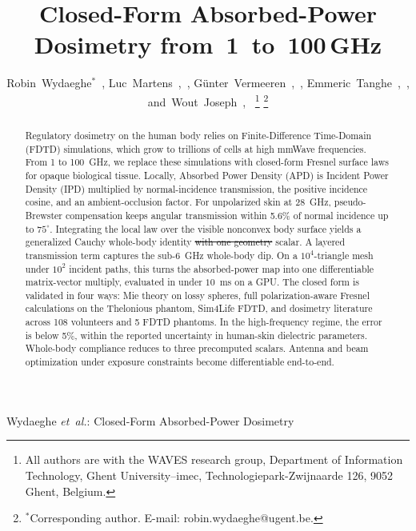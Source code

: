 \documentclass[journal,twocolumn,10pt]{IEEEtran}
\providecommand{\DIFaddtex}[1]{{\protect\color{blue}\uwave{#1}}} %
\providecommand{\DIFdeltex}[1]{{\protect\color{red}\sout{#1}}}                      %
\providecommand{\DIFaddbegin}{} %
\providecommand{\DIFaddend}{} %
\providecommand{\DIFdelbegin}{} %
\providecommand{\DIFdelend}{} %
\providecommand{\DIFadd}[1]{\texorpdfstring{\DIFaddtex{#1}}{#1}} %
\providecommand{\DIFdel}[1]{\texorpdfstring{\DIFdeltex{#1}}{}} %
\newcommand{\DIFscaledelfig}{0.5}
\newlength{\DIFdelgraphicswidth} %
\newlength{\DIFdelgraphicsheight} %
\newcommand{\DIFaddincludegraphics}[2][]{{\color{blue}\fbox{\DIFOincludegraphics[#1]{#2}}}} %
\newcommand{\DIFdelincludegraphics}[2][]{%
\sbox{\DIFdelgraphicsbox}{\DIFOincludegraphics[#1]{#2}}%
\settoboxwidth{\DIFdelgraphicswidth}{\DIFdelgraphicsbox} %
\settoboxtotalheight{\DIFdelgraphicsheight}{\DIFdelgraphicsbox} %
\scalebox{\DIFscaledelfig}{%
\parbox[b]{\DIFdelgraphicswidth}{\usebox{\DIFdelgraphicsbox}\\[-\baselineskip] \rule{\DIFdelgraphicswidth}{0em}}\llap{\resizebox{\DIFdelgraphicswidth}{\DIFdelgraphicsheight}{%
\setlength{\unitlength}{\DIFdelgraphicswidth}%
\begin{picture}(1,1)%
\thicklines\linethickness{2pt} %
{\color[rgb]{1,0,0}\put(0,0){\framebox(1,1){}}}%
{\color[rgb]{1,0,0}\put(0,0){\line( 1,1){1}}}%
{\color[rgb]{1,0,0}\put(0,1){\line(1,-1){1}}}%
\end{picture}%
}\hspace*{3pt}}} %
} %
\DeclareRobustCommand{\DIFaddbegin}{\DIFOaddbegin \let\includegraphics\DIFaddincludegraphics} %
\DeclareRobustCommand{\DIFaddend}{\DIFOaddend \let\includegraphics\DIFOincludegraphics} %
\DeclareRobustCommand{\DIFdelbegin}{\DIFOdelbegin \let\includegraphics\DIFdelincludegraphics} %
\DeclareRobustCommand{\DIFdelend}{\DIFOaddend \let\includegraphics\DIFOincludegraphics} %
\begin{document}
\title{Closed-Form Absorbed-Power Dosimetry from~1~to~100\,GHz}

\author{Robin~Wydaeghe$^{*}$~,
  Luc~Martens~,~,
  G\"unter~Vermeeren~,~,
  Emmeric~Tanghe~,~,
  and~Wout~Joseph~,~%
  \thanks{All authors are with the WAVES research group, Department of
  Information Technology, Ghent University--imec, Technologiepark-Zwijnaarde
  126, 9052 Ghent, Belgium.}%
  \thanks{$^{*}$Corresponding author. E-mail: robin.wydaeghe@ugent.be.}}

%
{Wydaeghe \MakeLowercase{\textit{et~al.}}: Closed-Form
Absorbed-Power Dosimetry}

\maketitle

\begin{abstract}
Regulatory dosimetry on the human body relies on Finite-Difference
Time-Domain (FDTD) simulations, which grow to trillions of cells at
high mmWave frequencies. From 1 to 100~GHz, we replace these
simulations with closed-form Fresnel surface laws for opaque
biological tissue. Locally, Absorbed Power Density (APD) is Incident
Power Density (IPD) multiplied by normal-incidence transmission, the positive
incidence cosine, and an ambient-occlusion factor. For
unpolarized skin at 28~GHz, pseudo-Brewster compensation keeps
angular transmission within 5.6\% of normal incidence up to
$75^\circ$. Integrating the local law over the visible nonconvex body
surface yields a generalized Cauchy whole-body identity \DIFdelbegin \DIFdel{with one
geometry }\DIFdelend \DIFaddbegin \DIFadd{governed by a
single geometry-dependent }\DIFaddend scalar. A layered transmission term captures the sub-6~GHz
whole-body dip. On a $10^4$-triangle mesh under $10^2$ incident
paths, this turns the absorbed-power map into one differentiable
matrix-vector multiply, evaluated in under $10$~ms on a GPU. The
closed form is validated in four ways: Mie theory on lossy spheres,
full polarization-aware Fresnel calculations on the Thelonious
phantom, Sim4Life FDTD, and dosimetry literature across 108
volunteers and 5 FDTD phantoms. In the high-frequency regime, the
error is below 5\%, within the reported uncertainty in human-skin
dielectric parameters. Whole-body compliance reduces to three
precomputed scalars. Antenna and beam optimization under exposure
constraints become differentiable end-to-end.
\end{abstract}
\end{document}
